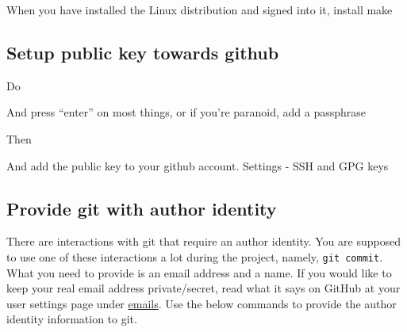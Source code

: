 When you have installed the Linux distribution and signed into it,
install make

\begin{Shaded}
\begin{Highlighting}[]
\end{Highlighting}
\end{Shaded}

\subsection{Setup public key towards
github}\label{setup-public-key-towards-github}

Do

\begin{Shaded}
\begin{Highlighting}[]
 
\end{Highlighting}
\end{Shaded}

And press ``enter'' on most things, or if you're paranoid, add a
passphrase

Then

\begin{Shaded}
\begin{Highlighting}[]
\end{Highlighting}
\end{Shaded}

And add the public key to your github account. Settings - SSH and GPG
keys

\subsection{Provide git with author
identity}\label{provide-git-with-author-identity}

There are interactions with git that require an author identity. You are
supposed to use one of these interactions a lot during the project,
namely, \texttt{git\ commit}. What you need to provide is an email
address and a name. If you would like to keep your real email address
private/secret, read what it says on GitHub at your user settings page
under \href{https://github.com/settings/emails}{emails}. Use the below
commands to provide the author identity information to git.

\begin{Shaded}
\begin{Highlighting}[]
\end{Highlighting}
\end{Shaded}

